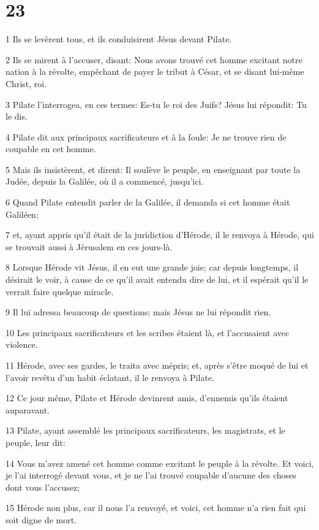 \chapter{23}

\par 1 Ils se levèrent tous, et ils conduisirent Jésus devant Pilate.
\par 2 Ils se mirent à l'accuser, disant: Nous avons trouvé cet homme excitant notre nation à la révolte, empêchant de payer le tribut à César, et se disant lui-même Christ, roi.
\par 3 Pilate l'interrogea, en ces termes: Es-tu le roi des Juifs? Jésus lui répondit: Tu le dis.
\par 4 Pilate dit aux principaux sacrificateurs et à la foule: Je ne trouve rien de coupable en cet homme.
\par 5 Mais ils insistèrent, et dirent: Il soulève le peuple, en enseignant par toute la Judée, depuis la Galilée, où il a commencé, jusqu'ici.
\par 6 Quand Pilate entendit parler de la Galilée, il demanda si cet homme était Galiléen;
\par 7 et, ayant appris qu'il était de la juridiction d'Hérode, il le renvoya à Hérode, qui se trouvait aussi à Jérusalem en ces jours-là.
\par 8 Lorsque Hérode vit Jésus, il en eut une grande joie; car depuis longtemps, il désirait le voir, à cause de ce qu'il avait entendu dire de lui, et il espérait qu'il le verrait faire quelque miracle.
\par 9 Il lui adressa beaucoup de questions; mais Jésus ne lui répondit rien.
\par 10 Les principaux sacrificateurs et les scribes étaient là, et l'accusaient avec violence.
\par 11 Hérode, avec ses gardes, le traita avec mépris; et, après s'être moqué de lui et l'avoir revêtu d'un habit éclatant, il le renvoya à Pilate.
\par 12 Ce jour même, Pilate et Hérode devinrent amis, d'ennemis qu'ils étaient auparavant.
\par 13 Pilate, ayant assemblé les principaux sacrificateurs, les magistrats, et le peuple, leur dit:
\par 14 Vous m'avez amené cet homme comme excitant le peuple à la révolte. Et voici, je l'ai interrogé devant vous, et je ne l'ai trouvé coupable d'aucune des choses dont vous l'accusez;
\par 15 Hérode non plus, car il nous l'a renvoyé, et voici, cet homme n'a rien fait qui soit digne de mort.
